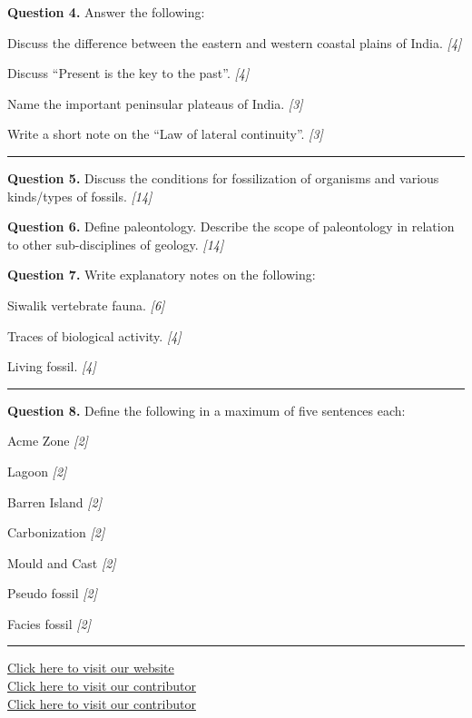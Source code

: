 \documentclass[11pt,a4paper]{article}
\newcommand{\pts}[1]{\hfill   \textit{[#1]}}
\begin{document}
\medskip


\noindent   \textbf{Question 4.} Answer the following:

\begin{parts}
  \item Discuss the difference between the eastern and western coastal plains of India. \pts{4}
  \item Discuss ``Present is the key to the past''. \pts{4}
  \item Name the important peninsular plateaus of India. \pts{3}
  \item Write a short note on the ``Law of lateral continuity''. \pts{3}
\end{parts}

\bigskip


\rule{\linewidth}{0.4pt}\smallskip




\noindent   \textbf{Question 5.} Discuss the conditions for fossilization of organisms and various kinds/types of fossils. \pts{14}

\medskip


\noindent   \textbf{Question 6.} Define paleontology. Describe the scope of paleontology in relation to other sub-disciplines of geology. \pts{14}

\medskip


\noindent   \textbf{Question 7.} Write explanatory notes on the following:

\begin{parts}
  \item Siwalik vertebrate fauna. \pts{6}
  \item Traces of biological activity. \pts{4}
  \item Living fossil. \pts{4}
\end{parts}

\bigskip


\rule{\linewidth}{0.4pt}\smallskip




\noindent   \textbf{Question 8.} Define the following in a maximum of five sentences each:

\begin{romanparts}
  \item Acme Zone \pts{2}
  \item Lagoon \pts{2}
  \item Barren Island \pts{2}
  \item Carbonization \pts{2}
  \item Mould and Cast \pts{2}
  \item Pseudo fossil \pts{2}
  \item Facies fossil \pts{2}
\end{romanparts}

\vfill\rule{\linewidth}{0.4pt}

\begin{center}\small
\href{https://bhu-exam.vercel.app/}{Click here to visit our website}\\[4pt]
\href{https://me-aryan.vercel.app/}{Click here to visit our contributor}\\[4pt]
\href{https://quashan-me.vercel.app/}{Click here to visit our contributor}
\end{center}
\end{document}
